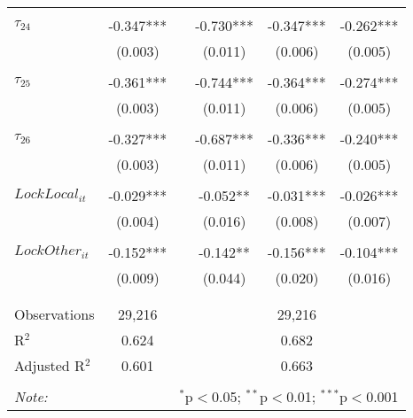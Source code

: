 \begin{tabular}{@{\extracolsep{-5pt}}lccccc}
                &           &&           &           &           \\[-2.1ex]
$\tau_{24}$     & -0.347*** && -0.730*** & -0.347*** & -0.262*** \\
                &  (0.003)  &&  (0.011)  &  (0.006)  &  (0.005)  \\
                &           &&           &           &           \\[-2.1ex]
$\tau_{25}$     & -0.361*** && -0.744*** & -0.364*** & -0.274*** \\
                &  (0.003)  &&  (0.011)  &  (0.006)  &  (0.005)  \\
                &           &&           &           &           \\[-2.1ex]
$\tau_{26}$     & -0.327*** && -0.687*** & -0.336*** & -0.240*** \\
                &  (0.003)  &&  (0.011)  &  (0.006)  &  (0.005)  \\
                &           &&           &           &           \\[-1.ex]
$LockLocal_{it}$ & -0.029*** &&  -0.052** & -0.031*** & -0.026*** \\
                &  (0.004)  &&  (0.016)  &  (0.008)  &  (0.007)  \\
                &           &&           &           &           \\[-2.1ex]
$LockOther_{it}$& -0.152*** &&  -0.142** & -0.156*** & -0.104*** \\
                &  (0.009)  &&  (0.044)  &  (0.020)  &  (0.016)  \\
                &           &&           &           &           \\[-2.1ex]

\hline \\[-1.8ex] 
Observations     & 29,216 && \multicolumn{3}{c}{29,216} \\ 
R$^{2}$          &  0.624 && \multicolumn{3}{c}{0.682 } \\ 
Adjusted R$^{2}$ &  0.601 && \multicolumn{3}{c}{0.663 } \\ 
\hline 
\hline \\[-1.8ex] 
\textit{Note:}  & \multicolumn{5}{r}{$^{*}$p$<$0.05; $^{**}$p$<$0.01; $^{***}$p$<$0.001} \\ 
\end{tabular} 